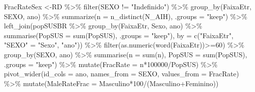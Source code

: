 \documentclass[
  letterpaper,
  DIV=11,
  numbers=noendperiod]{scrartcl}
\newenvironment{Shaded}{\begin{snugshade}}{\end{snugshade}}
\newcommand{\AttributeTok}[1]{\textcolor[rgb]{0.40,0.45,0.13}{#1}}
\newcommand{\DecValTok}[1]{\textcolor[rgb]{0.68,0.00,0.00}{#1}}
\newcommand{\FunctionTok}[1]{\textcolor[rgb]{0.28,0.35,0.67}{#1}}
\newcommand{\NormalTok}[1]{\textcolor[rgb]{0.00,0.23,0.31}{#1}}
\newcommand{\OtherTok}[1]{\textcolor[rgb]{0.00,0.23,0.31}{#1}}
\newcommand{\SpecialCharTok}[1]{\textcolor[rgb]{0.37,0.37,0.37}{#1}}
\newcommand{\StringTok}[1]{\textcolor[rgb]{0.13,0.47,0.30}{#1}}
\begin{document}
\begin{Shaded}
\begin{Highlighting}[]
\NormalTok{FracRateSex }\OtherTok{\textless{}{-}}\NormalTok{RD }\SpecialCharTok{\%\textgreater{}\%} 
  \FunctionTok{filter}\NormalTok{(SEXO }\SpecialCharTok{!=} \StringTok{"Indefinido"}\NormalTok{) }\SpecialCharTok{\%\textgreater{}\%} 
  \FunctionTok{group\_by}\NormalTok{(FaixaEtr, SEXO, ano) }\SpecialCharTok{\%\textgreater{}\%}
  \FunctionTok{summarize}\NormalTok{(}\AttributeTok{n =} \FunctionTok{n\_distinct}\NormalTok{(N\_AIH), }\AttributeTok{.groups =} \StringTok{"keep"}\NormalTok{) }\SpecialCharTok{\%\textgreater{}\%} 
  \FunctionTok{left\_join}\NormalTok{(popSUSBR }\SpecialCharTok{\%\textgreater{}\%} \FunctionTok{group\_by}\NormalTok{(FaixaEtr, Sexo, ano) }\SpecialCharTok{\%\textgreater{}\%} \FunctionTok{summarise}\NormalTok{(}\AttributeTok{PopSUS =} \FunctionTok{sum}\NormalTok{(PopSUS), }\AttributeTok{.groups =} \StringTok{"keep"}\NormalTok{), }\AttributeTok{by =} \FunctionTok{c}\NormalTok{(}\StringTok{"FaixaEtr"}\NormalTok{, }\StringTok{"SEXO"} \OtherTok{=} \StringTok{"Sexo"}\NormalTok{, }\StringTok{"ano"}\NormalTok{)) }\SpecialCharTok{\%\textgreater{}\%} 
  \FunctionTok{filter}\NormalTok{(}\FunctionTok{as.numeric}\NormalTok{(}\FunctionTok{word}\NormalTok{(FaixaEtr))}\SpecialCharTok{\textgreater{}=}\DecValTok{60}\NormalTok{) }\SpecialCharTok{\%\textgreater{}\%} 
  \FunctionTok{group\_by}\NormalTok{(SEXO, ano) }\SpecialCharTok{\%\textgreater{}\%} 
  \FunctionTok{summarise}\NormalTok{(}\AttributeTok{n =} \FunctionTok{sum}\NormalTok{(n),}
            \AttributeTok{PopSUS =} \FunctionTok{sum}\NormalTok{(PopSUS), }\AttributeTok{.groups =} \StringTok{"keep"}\NormalTok{) }\SpecialCharTok{\%\textgreater{}\%} 
  \FunctionTok{mutate}\NormalTok{(}\AttributeTok{FracRate =}\NormalTok{ n}\SpecialCharTok{*}\DecValTok{100000}\SpecialCharTok{/}\NormalTok{PopSUS) }\SpecialCharTok{\%\textgreater{}\%} 
  \FunctionTok{pivot\_wider}\NormalTok{(}\AttributeTok{id\_cols =}\NormalTok{ ano, }\AttributeTok{names\_from =}\NormalTok{ SEXO, }\AttributeTok{values\_from =}\NormalTok{ FracRate) }\SpecialCharTok{\%\textgreater{}\%} 
  \FunctionTok{mutate}\NormalTok{(}\AttributeTok{MaleRateFrac =}\NormalTok{ Masculino}\SpecialCharTok{*}\DecValTok{100}\SpecialCharTok{/}\NormalTok{(Masculino}\SpecialCharTok{+}\NormalTok{Feminino))}



\end{Highlighting}
\end{Shaded}
\end{document}
